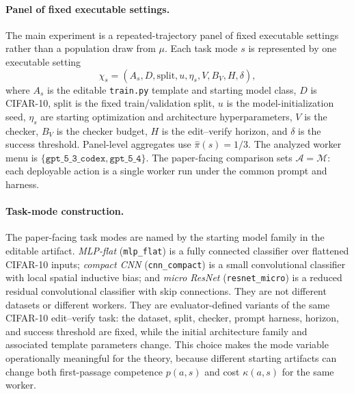 \documentclass{article}
\newcommand{\cA}{\mathcal{A}}
\newcommand{\cM}{\mathcal{M}}
\begin{document}
\paragraph{Panel of fixed executable settings.}
The main experiment is a repeated-trajectory panel of fixed executable settings rather than a population draw from \(\mu\).
Each task mode \(s\) is represented by one executable setting
\[
\chi_s=(A_s,D,\mathrm{split},u,\eta_s,V,B_V,H,\delta),
\]
where \(A_s\) is the editable \texttt{train.py} template and starting model class, \(D\) is CIFAR-10, \(\mathrm{split}\) is the fixed train/validation split, \(u\) is the model-initialization seed, \(\eta_s\) are starting optimization and architecture hyperparameters, \(V\) is the checker, \(B_V\) is the checker budget, \(H\) is the edit--verify horizon, and \(\delta\) is the success threshold.
Panel-level aggregates use \(\hat\pi(s)=1/3\).
The analyzed worker menu is \(\{\texttt{gpt\_5\_3\_codex},\texttt{gpt\_5\_4}\}\).
The paper-facing comparison sets \(\cA=\cM\): each deployable action is a single worker run under the common prompt and harness.

\paragraph{Task-mode construction.}
The paper-facing task modes are named by the starting model family in the editable artifact.
\textit{MLP-flat} (\texttt{mlp\_flat}) is a fully connected classifier over flattened CIFAR-10 inputs; \textit{compact CNN} (\texttt{cnn\_compact}) is a small convolutional classifier with local spatial inductive bias; and \textit{micro ResNet} (\texttt{resnet\_micro}) is a reduced residual convolutional classifier with skip connections.
They are not different datasets or different workers.
They are evaluator-defined variants of the same CIFAR-10 edit--verify task: the dataset, split, checker, prompt harness, horizon, and success threshold are fixed, while the initial architecture family and associated template parameters change.
This choice makes the mode variable operationally meaningful for the theory, because different starting artifacts can change both first-passage competence \(p(a,s)\) and cost \(\kappa(a,s)\) for the same worker.
\end{document}
